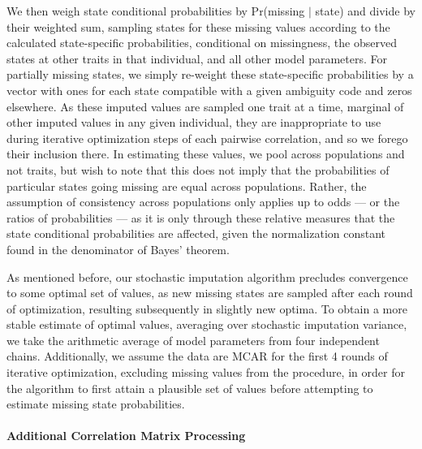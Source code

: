 \documentclass[12pt, twocolumn, twoside]{article}
\begin{document}
We then weigh state conditional probabilities by Pr(missing $\vert$ state) and divide by their weighted sum, sampling states for these missing values according to the calculated state-specific probabilities, conditional on missingness, the observed states at other traits in that individual, and all other model parameters. For partially missing states, we simply re-weight these state-specific probabilities by a vector with ones for each state compatible with a given ambiguity code and zeros elsewhere. As these imputed values are sampled one trait at a time, marginal of other imputed values in any given individual, they are inappropriate to use during iterative optimization steps of each pairwise correlation, and so we forego their inclusion there. In estimating these values, we pool across populations and not traits, but wish to note that this does not imply that the probabilities of particular states going missing are equal across populations. Rather, the assumption of consistency across populations only applies up to odds --- or the ratios of probabilities --- as it is only through these relative measures that the state conditional probabilities are affected, given the normalization constant found in the denominator of Bayes' theorem.

As mentioned before, our stochastic imputation algorithm precludes convergence to some optimal set of values, as new missing states are sampled after each round of optimization, resulting subsequently in slightly new optima. To obtain a more stable estimate of optimal values, averaging over stochastic imputation variance, we take the arithmetic average of model parameters from four independent chains. Additionally, we assume the data are MCAR for the first 4 rounds of iterative optimization, excluding missing values from the procedure, in order for the algorithm to first attain a plausible set of values before attempting to estimate missing state probabilities. 

\paragraph{Additional Correlation Matrix Processing}
\end{document}
